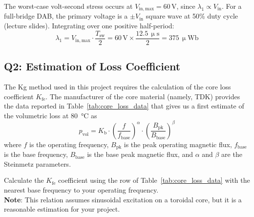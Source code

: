 \documentclass{PELsmallreport}
\begin{document}
\begin{framed}
The worst-case volt-second stress occurs at $V_\mathrm{in,max}=60\,\mathrm{V}$, since $\lambda_1\propto V_\mathrm{in}$.
For a full-bridge DAB, the primary voltage is a $\pm V_\mathrm{in}$ square wave at 50\% duty cycle (lecture slides).
Integrating over one positive half-period:
\begin{equation}
    \lambda_1 = V_\mathrm{in,max}\cdot\frac{T_\mathrm{sw}}{2} = 60\,\mathrm{V}\times\frac{12.5\,\upmu\mathrm{s}}{2} = 375\,\upmu\mathrm{Wb}
\end{equation}
\end{framed}

 \hfill{}





\subsection{Q2: Estimation of Loss Coefficient} 

The Kg method used in this project requires the calculation of the core loss coefficient $K_\mathrm{fe}$.
The manufacturer of the core material (namely, TDK) provides the data reported in Table~\ref{tab:core_loss_data} that gives us a first estimate of the volumetric loss at \qty{80}{\celsius} as \\
\begin{equation}
    p_\mathrm{vol} = K_\mathrm{b} \cdot \left( \frac{f}{f_\mathrm{base}}\right)^{\alpha} \cdot \left( \frac{B_\mathrm{pk}}{B_\mathrm{base}}\right)^{\beta}
    \label{eq:Kfe}
\end{equation}
where $f$ is the operating frequency, $B_\mathrm{pk}$ is the peak operating magnetic flux, $f_\mathrm{base}$ is the base frequency, $B_\mathrm{base}$ is the base peak magnetic flux, and $\alpha$ and $\beta$ are the Steinmetz parameters. 

Calculate the $K_\mathrm{fe}$ coefficient using the row of Table~\ref{tab:core_loss_data} with the nearest base frequency to your operating frequency.   
\\
\textbf{Note}: This relation assumes sinusoidal excitation on a toroidal core, but it is a reasonable estimation for your project. 
\end{document}
